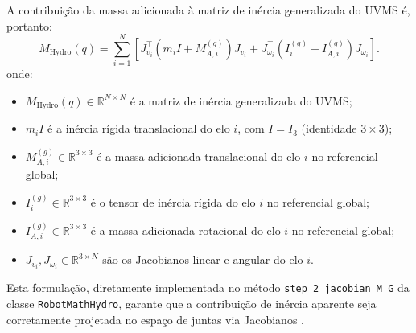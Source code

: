 A contribuição da massa adicionada à matriz de inércia generalizada do UVMS é, portanto:
\begin{equation}
    M_{\text{Hydro}}(q) = \sum_{i=1}^{N} \left[ J_{v_i}^\top (m_i I + M_{A,i}^{(g)}) J_{v_i} + J_{\omega_i}^\top (I_i^{(g)} + I_{A,i}^{(g)}) J_{\omega_i} \right].
    \label{eq:M_hydro}
\end{equation}
onde:
\begin{itemize}
    \item $M_{\text{Hydro}}(q) \in \mathbb{R}^{N\times N}$ é a matriz de inércia generalizada do UVMS;
    \item $m_i I$ é a inércia rígida translacional do elo $i$, com $I = I_3$ (identidade $3\times 3$);
    \item $M_{A,i}^{(g)} \in \mathbb{R}^{3\times 3}$ é a massa adicionada translacional do elo $i$ no referencial global;
    \item $I_i^{(g)} \in \mathbb{R}^{3\times 3}$ é o tensor de inércia rígida do elo $i$ no referencial global;
    \item $I_{A,i}^{(g)} \in \mathbb{R}^{3\times 3}$ é a massa adicionada rotacional do elo $i$ no referencial global;
    \item $J_{v_i}, J_{\omega_i} \in \mathbb{R}^{3\times N}$ são os Jacobianos linear e angular do elo $i$.
\end{itemize}
Esta formulação, diretamente implementada no método \texttt{step\_2\_jacobian\_M\_G} da classe \texttt{RobotMathHydro}, garante que a contribuição de inércia aparente seja corretamente projetada no espaço de juntas via Jacobianos \cite{antonelli2014modelling}.

